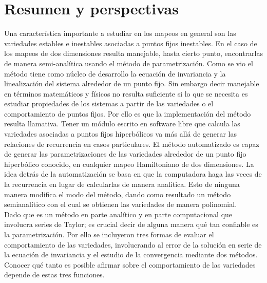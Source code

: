 
\chapter{Resumen y perspectivas}
Una característica importante a estudiar en los mapeos en general son las variedades estables e inestables asociadas a puntos fijos inestables. En el caso de los mapeos de dos dimensiones resulta manejable, hasta cierto punto, encontrarlas de manera semi-analítica usando el método de parametrización. Como se vio el método tiene como núcleo de desarrollo la ecuación de invariancia y la linealización del sistema alrededor de un punto fijo. Sin embargo decir manejable en términos matemáticos y físicos no resulta suficiente si lo que se necesita es estudiar propiedades de los sistemas a partir de las variedades o el comportamiento de puntos fijos. Por ello es que la implementación del método resulta llamativa. Tener un módulo escrito en software libre que calcula las variedades asociadas a puntos fijos hiperbólicos va más allá de generar las relaciones de recurrencia en casos particulares. El método automatizado es capaz de generar las parametrizaciones de las variedades alrededor de un punto fijo hiperbólico conocido, en cualquier mapeo Hamiltoniano de dos dimensiones. La idea detrás de la automatización se basa en que la computadora haga las veces de la recurrencia en lugar de calcularlas de manera analítica. Esto de ninguna manera modifica el modo del método, dando como resultado un método semianalítico con el cual se obtienen las variedades de manera polinomial. \\

Dado que es un método en parte analítico y en parte computacional que involucra series de Taylor; es crucial decir de alguna manera qué tan confiable es la parametrización. Por ello se incluyeron tres formas de evaluar el comportamiento de las variedades, involucrando al error de la solución en serie de la ecuación de invariancia y el estudio de la convergencia mediante dos métodos. Conocer qué tanto es posible afirmar sobre el comportamiento de las variedades depende de estas tres funciones.\\

